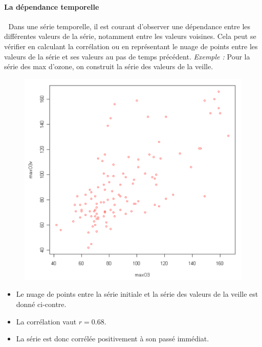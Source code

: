 \paragraph{La dépendance temporelle}\textcolor{white}{.}\newline
Dans une série temporelle, il est courant d'observer une dépendance entre les différentes valeurs de la série, notamment entre les valeurs voisines.\newline
Cela peut se vérifier en calculant la corrélation ou en représentant le nuage de points entre les valeurs de la série et ses valeurs au pas de temps précédent.
\textit{Exemple : } Pour la série des max d'ozone, on construit la série des valeurs de la veille.
\begin{figure}[H]\begin{center}\includegraphics[scale=0.5]{ilu/ccm26.png}\end{center}\end{figure}
\begin{itemize}
\item Le nuage de points entre la série initiale et la série des valeurs de la veille est donné ci-contre.
\item La corrélation vaut $r = 0.68$.
\item La série est donc corrélée positivement à son passé immédiat.
\end{itemize}
